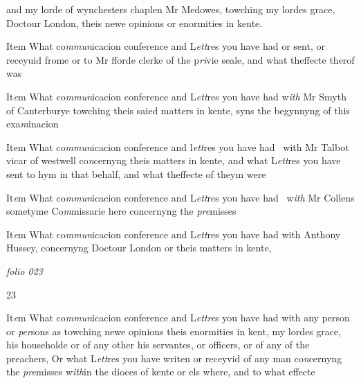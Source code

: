 \documentclass[12pt, a4paper]{book}
\begin{document}
 		and my lorde of wynchesters chaplen Mr Medowes, towching
 		my lordes grace, Doctour London, theis newe opinions or
 enormities in kente.
 	
				\marginpar[\vspace{0.5cm}{\textcolor{Gray}{n}}]{}
			
		\ifthenelse{\isodd{\thepage}}
		{\reversemarginpar}
		{\normalmarginpar}
		Item What co\textit{mmun}icacion conference and L\textit{ett}res you have had or
 sent, or receyuid frome or to Mr fforde clerke of the p\textit{ri}vie
 seale, and what theffecte therof was
 	
		\ifthenelse{\isodd{\thepage}}
		{\reversemarginpar}
		{\normalmarginpar}
		It\textit{e}m What co\textit{mmun}icacion conference and L\textit{ett}res you have had w\textit{ith}
 		Mr Smyth of Canterburye towching theis saied
 matters in kente, syns the begynnyng of this exa\textit{m}inacion
 	
 	
		\ifthenelse{\isodd{\thepage}}
		{\reversemarginpar}
		{\normalmarginpar}
		Item What co\textit{mmun}icacion conference and l\textit{ett}res you have had 
 with Mr Talbot vicar of westwell co\textit{n}cernyng theis
 matters in kente, and what L\textit{ett}res you have sent to hym
 in that behalf, and what theffecte of theym were
 	
 	
		\ifthenelse{\isodd{\thepage}}
		{\reversemarginpar}
		{\normalmarginpar}
		It\textit{e}m What co\textit{mmun}icacion conference and L\textit{ett}res you have had 
 w\textit{ith} Mr Collens sometyme Co\textit{m}missarie here concernyng
 the \textit{pre}misses 
 	
 	
		\ifthenelse{\isodd{\thepage}}
		{\reversemarginpar}
		{\normalmarginpar}
		It\textit{e}m What co\textit{mmun}icacion conference and L\textit{ett}res
 		you have had with Anthony Hussey, concernyng
 Doctour London or theis matters in kente,
 

\dotfill
						\newpage
{}

\textit{folio 023}


\begin{flushright}{\color{Mahogany}23}\end{flushright}
 	
		\ifthenelse{\isodd{\thepage}}
		{\reversemarginpar}
		{\normalmarginpar}
		It\textit{e}m What co\textit{mmun}icacion conference and L\textit{ettre}s you have
 had with any person or \textit{per}sons as towching newe opinions
 		theis enormities in kent, my lordes grace, his householde
 or of any other his servantes, or officers, or of any
 of the preachers, Or what L\textit{ett}res you have writen
 or receyvid of any man co\textit{n}cernyng the \textit{pre}misses w\textit{ith}in the
 		dioces of kente or els where, and to what effecte
 	
\end{document}
